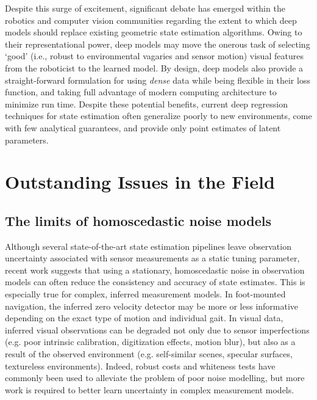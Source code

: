 Despite this surge of excitement, significant debate has emerged within the robotics and computer vision communities regarding the extent to which deep models should replace existing geometric state estimation algorithms. Owing to their representational power, deep models may move the onerous task of selecting `good' (i.e., robust to environmental vagaries and sensor motion) visual features from the roboticist to the learned model. By design, deep models also provide a straight-forward formulation for using \textit{dense} data while being flexible in their loss function, and taking full advantage of modern computing architecture to minimize run time. Despite these potential benefits, current deep regression techniques for state estimation often generalize poorly to new environments, come with few analytical guarantees, and provide only point estimates of latent parameters.


\section{Outstanding Issues in the Field}

\subsection{The limits of homoscedastic noise models}

Although several state-of-the-art state estimation pipelines  \citep{Leutenegger2015-fk, Cvisic2015-mt} leave observation uncertainty associated with sensor measurements as a static tuning parameter, recent work \citep{Vega-Brown2014-sb, Hu2015-uw} suggests that using a stationary, homoscedastic noise in observation models can often reduce the consistency and accuracy of state estimates. This is especially true for complex, inferred measurement models. In foot-mounted navigation, the inferred zero velocity detector may be more or less informative depending on the exact type of motion and individual gait. In visual data, inferred visual observations can be degraded not only due to sensor imperfections (e.g. poor intrinsic calibration, digitization effects, motion blur), but also as a result of the observed environment (e.g. self-similar scenes, specular surfaces, textureless environments). Indeed, robust costs \cite{Alcantarilla2016-kv, MacTavish2015-wt, Agarwal2013-jq} and whiteness tests \citep{Tsotsos2015-qs} have commonly been used to alleviate the problem of poor noise modelling, but more work is required to better learn uncertainty in complex measurement models.


